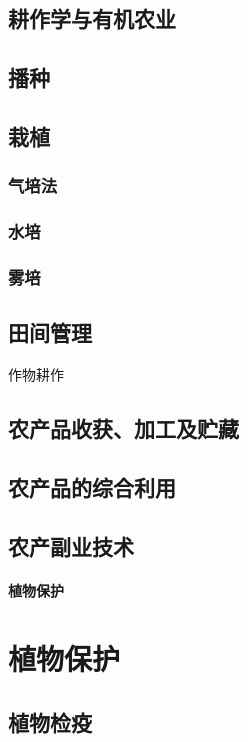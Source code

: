 \documentclass[UTF8]{../ApplicationUniverse}
\begin{document}
\section{耕作学与有机农业}
\section{播种}
\section{栽植}
    \subsection{气培法}
    \subsection{水培}
    \subsection{雾培}
\section{田间管理}
作物耕作
\section{农产品收获、加工及贮藏}
\section{农产品的综合利用}
\section{农产副业技术}












\subsubsection{植物保护}





\chapter{植物保护}
\section{植物检疫}
\end{document}
